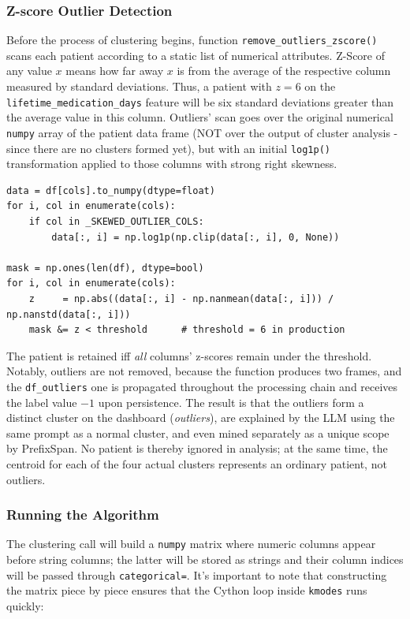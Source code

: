 \subsubsection*{Z-score Outlier Detection}
\label{ch: z_score}

Before the process of clustering begins, function \texttt{remove\_outliers\_zscore()} scans each patient according to a static list of numerical attributes. Z-Score of any value \(x\) means how far away \(x\) is from the average of the respective column measured by standard deviations. Thus, a patient with \(z=6\) on the \texttt{lifetime\_medication\_days} feature will be six standard deviations greater than the average value in this column. Outliers' scan goes over the original numerical \texttt{numpy} array of the patient data frame (NOT over the output of cluster analysis - since there are no clusters formed yet), but with an initial \texttt{log1p()} transformation applied to those columns with strong right skewness.

\begin{lstlisting}[style=pythonstyle]
data = df[cols].to_numpy(dtype=float)
for i, col in enumerate(cols):
    if col in _SKEWED_OUTLIER_COLS:
        data[:, i] = np.log1p(np.clip(data[:, i], 0, None))

mask = np.ones(len(df), dtype=bool)
for i, col in enumerate(cols):
    z     = np.abs((data[:, i] - np.nanmean(data[:, i])) / np.nanstd(data[:, i]))
    mask &= z < threshold      # threshold = 6 in production
\end{lstlisting}

The patient is retained iff \emph{all} columns' z-scores remain under the threshold. Notably, outliers are not removed, because the function produces two frames, and the \texttt{df\_outliers} one is propagated throughout the processing chain and receives the label value \(-1\) upon persistence. The result is that the outliers form a distinct cluster on the dashboard (\emph{outliers}), are explained by the LLM using the same prompt as a normal cluster, and even mined separately as a unique scope by PrefixSpan. No patient is thereby ignored in analysis; at the same time, the centroid for each of the four actual clusters represents an ordinary patient, not outliers.

\subsubsection*{Running the Algorithm}

The clustering call will build a \texttt{numpy} matrix where numeric columns appear before string columns; the latter will be stored as strings and their column indices will be passed through \texttt{categorical=}. It’s important to note that constructing the matrix piece by piece ensures that the Cython loop inside \texttt{kmodes} runs quickly:

